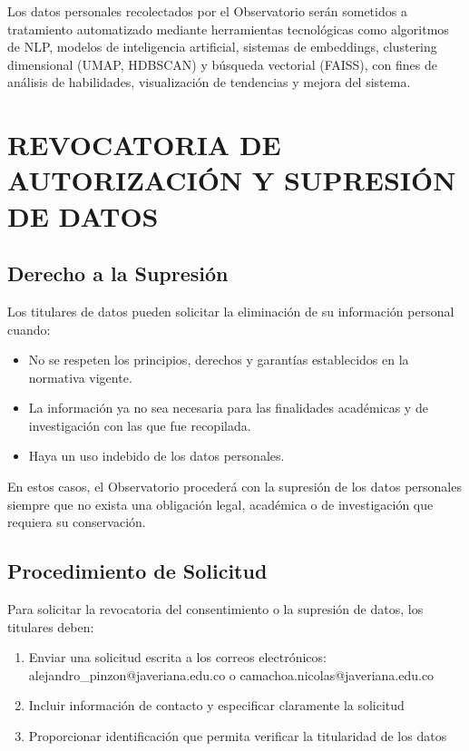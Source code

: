 \documentclass[11pt,oneside,letterpaper]{article}
\begin{document}
Los datos personales recolectados por el Observatorio serán sometidos a tratamiento automatizado mediante herramientas tecnológicas como algoritmos de NLP, modelos de inteligencia artificial, sistemas de embeddings, clustering dimensional (UMAP, HDBSCAN) y búsqueda vectorial (FAISS), con fines de análisis de habilidades, visualización de tendencias y mejora del sistema.

\newpage

\section{REVOCATORIA DE AUTORIZACIÓN Y SUPRESIÓN DE DATOS}

\subsection{Derecho a la Supresión}

Los titulares de datos pueden solicitar la eliminación de su información personal cuando:

\begin{itemize}
    \item No se respeten los principios, derechos y garantías establecidos en la normativa vigente.
    \item La información ya no sea necesaria para las finalidades académicas y de investigación con las que fue recopilada.
    \item Haya un uso indebido de los datos personales.
\end{itemize}

En estos casos, el Observatorio procederá con la supresión de los datos personales siempre que no exista una obligación legal, académica o de investigación que requiera su conservación.

\subsection{Procedimiento de Solicitud}

Para solicitar la revocatoria del consentimiento o la supresión de datos, los titulares deben:

\begin{enumerate}
    \item Enviar una solicitud escrita a los correos electrónicos: alejandro\_pinzon@javeriana.edu.co o camachoa.nicolas@javeriana.edu.co
    \item Incluir información de contacto y especificar claramente la solicitud
    \item Proporcionar identificación que permita verificar la titularidad de los datos
\end{enumerate}
\end{document}
